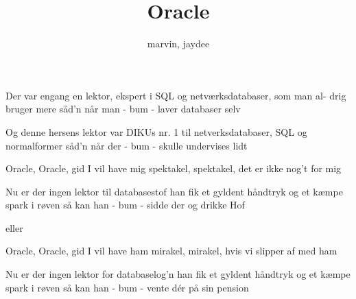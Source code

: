 \documentclass[danish]{article}
\title{Oracle}
\author{marvin, jaydee}
\begin{document}
\maketitle

\begin{song}

Der var engang en lektor,
ekspert i SQL
og netværksdatabaser, som man al-
  drig bruger mere
såd'n når man - bum -
laver databaser selv

Og denne hersens lektor
var DIKUs nr. 1
til netverksdatabaser, SQL
  og normalformer
såd'n når der - bum -
skulle undervises lidt

Oracle, Oracle, gid I vil have mig
 spektakel, spektakel, det er ikke nog't for mig

Nu er der ingen lektor
til databasestof
han fik et gyldent håndtryk og et kæmpe
  spark i røven
så kan han - bum -
sidde der og drikke Hof

\scene eller

Oracle, Oracle, gid I vil have ham
 mirakel, mirakel, hvis vi slipper af med ham
 
Nu er der ingen lektor
for databaselog'n
han fik et gyldent håndtryk og et kæmpe
  spark i røven
så kan han - bum -
vente dér på sin pension

\end{song}
\end{document}
